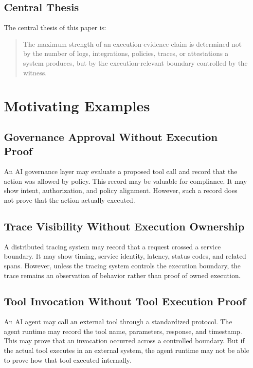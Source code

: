\documentclass[11pt]{article}
\begin{document}
\subsection{Central Thesis}

The central thesis of this paper is:

\begin{quote}
The maximum strength of an execution-evidence claim is determined not by the number of logs, integrations, policies, traces, or attestations a system produces, but by the execution-relevant boundary controlled by the witness.
\end{quote}

\section{Motivating Examples}

\subsection{Governance Approval Without Execution Proof}
An AI governance layer may evaluate a proposed tool call and record that the action was allowed by policy. This record may be valuable for compliance. It may show intent, authorization, and policy alignment. However, such a record does not prove that the action actually executed.

\subsection{Trace Visibility Without Execution Ownership}
A distributed tracing system may record that a request crossed a service boundary. It may show timing, service identity, latency, status codes, and related spans. However, unless the tracing system controls the execution boundary, the trace remains an observation of behavior rather than proof of owned execution.

\subsection{Tool Invocation Without Tool Execution Proof}
An AI agent may call an external tool through a standardized protocol. The agent runtime may record the tool name, parameters, response, and timestamp. This may prove that an invocation occurred across a controlled boundary. But if the actual tool executes in an external system, the agent runtime may not be able to prove how that tool executed internally.
\end{document}
